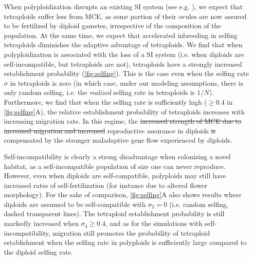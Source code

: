 \documentclass[12pt,a4paper]{article}
\providecommand{\DIFadd}[1]{{\protect\color{blue}\uwave{#1}}} %
\providecommand{\DIFdel}[1]{{\protect\color{red}\sout{#1}}}                      %
\providecommand{\DIFaddbegin}{} %
\providecommand{\DIFaddend}{} %
\providecommand{\DIFdelbegin}{} %
\providecommand{\DIFdelend}{} %
\begin{document}
When polyploidization disrupts an existing SI system (see e.g.
\cite{robertson2011comparative,zenil2019,novikova2023}), we expect that
tetraploids suffer less from MCE, as some portion of their ovules are now
assured to be fertilized by diploid gametes, irrespective of the composition of
the population.
At the same time, we expect that accelerated inbreeding in selfing tetraploids
diminishes the adaptive advantage of tetraploids.
We find that when polyploidization is associated with the loss of a SI system
(i.e. when diploids are self-incompatible, but tetraploids are not),
tetraploids have a strongly increased establishment probability
(\cref{fig:selfing}).
This is the case even when the selfing rate $\sigma$ in tetraploids is zero (in
which case, under our modeling assumptions, there is only random selfing, i.e.
the \textit{realized} selfing rate in tetraploids is $1/N$).
Furthermore, we find that when the selfing rate is sufficiently high ($\ge 0.4$
in \cref{fig:selfing}A), the relative establishment probability of tetraploids
increases with increasing migration rate.
In this regime, the \DIFdelbegin \DIFdel{increased strength of MCE due to increased migration and
increased }\DIFdelend \DIFaddbegin \DIFadd{effects of migration on MCE and }\DIFaddend reproductive assurance in
diploids \DIFdelbegin \DIFdel{is }\DIFdelend \DIFaddbegin \DIFadd{are }\DIFaddend compensated by the stronger maladaptive gene flow experienced by
diploids.

Self-incompatibility is clearly a strong disadvantage when colonizing a novel
habitat, as a self-incompatible population of size one can never reproduce.
However, even when diploids are self-compatible, polyploids may still have
increased rates of self-fertilization (for instance due to altered flower
morphology).
For the sake of comparison, \cref{fig:selfing}A also shows results where
diploids are assumed to be self-compatible with $\sigma_2=0$ (i.e. random
selfing, dashed transparent lines).
The tetraploid establishment probability is still markedly increased when
$\sigma_4 \ge 0.4$, and as for the simulations with self-incompatibility,
migration still promotes the probability of tetraploid establishment when the
selfing rate in polyploids is sufficiently large compared to the diploid
selfing rate.
\end{document}
